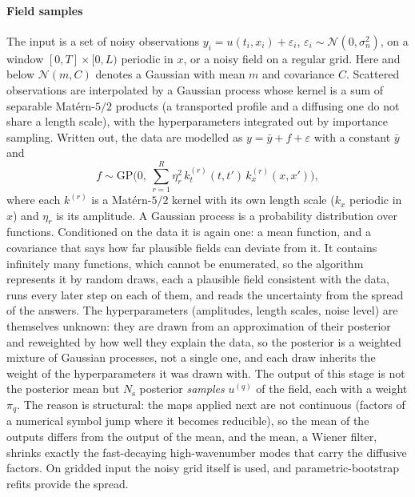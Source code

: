 \documentclass[11pt]{article}
\theoremstyle{plain}
\theoremstyle{definition}
\theoremstyle{remark}
\newcommand{\noise}{\sigma_{n}}             %
\newcommand{\Nsamp}{N_{\mathrm s}}          %
\newcommand{\Normal}{\mathcal{N}}
\begin{document}
\paragraph{Field samples} The input is a set of noisy observations $y_i=u(t_i,x_i)+\varepsilon_i$,
$\varepsilon_i\sim\Normal(0,\noise^2)$, on a window $[0,T]\times[0,L)$ periodic in $x$, or a noisy field on a regular grid. Here and below $\Normal(m,C)$ denotes a Gaussian with mean $m$ and covariance $C$.
Scattered observations are interpolated by a Gaussian process whose kernel is a sum of separable Mat\'ern-$5/2$
products (a transported profile and a diffusing one do not share a length scale), with the hyperparameters integrated
out by importance sampling. Written out, the data are modelled as $y=\bar y+f+\varepsilon$ with a constant $\bar y$ and
\begin{equation}\label{eq:gp}
  f\sim\mathrm{GP}\Big(0,\ \sum_{r=1}^R\eta_r^2\,k_t^{(r)}(t,t')\,k_x^{(r)}(x,x')\Big),
\end{equation}
where each $k^{(r)}$ is a Mat\'ern-$5/2$ kernel with its own length scale ($k_x$ periodic in $x$) and $\eta_r$ is its
amplitude. A Gaussian process is a probability distribution over functions. Conditioned on the data it is again one: a
mean function, and a covariance that says how far plausible fields can deviate from it. It contains infinitely many
functions, which cannot be enumerated, so the algorithm represents it by random draws, each a plausible field
consistent with the data, runs every later step on each of them, and reads the uncertainty from the spread of the
answers. The hyperparameters (amplitudes, length scales, noise level) are themselves unknown: they are drawn from an
approximation of their posterior and reweighted by how well they explain the data, so the posterior is a weighted
mixture of Gaussian processes, not a single one, and each draw inherits the weight of the hyperparameters it was drawn
with. The output of this stage is not the posterior mean but $\Nsamp$ posterior \emph{samples}
$u^{(q)}$ of the field, each with a weight $\pi_q$. The reason is structural: the maps applied next are not continuous
(factors of a numerical symbol jump where it becomes reducible), so the mean of the outputs differs from the output of
the mean, and the mean, a Wiener filter, shrinks exactly the fast-decaying high-wavenumber modes that carry the
diffusive factors. On gridded input the noisy grid itself is used, and parametric-bootstrap refits provide the spread.
\end{document}

